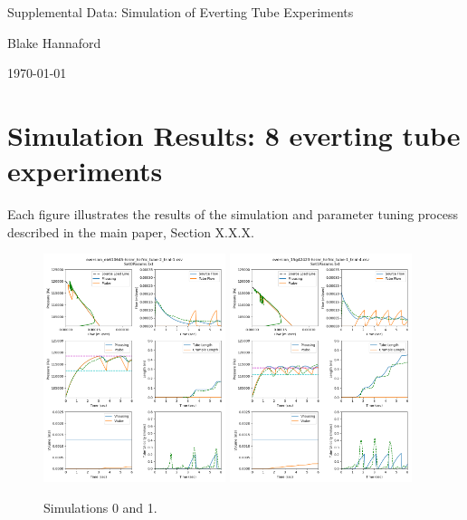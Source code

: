 \documentclass[letterpaper]{article}
\begin{document}
\begin{centering}
{\Large  Supplemental Data: Simulation of Everting Tube Experiments}

Blake Hannaford

\today

\end{centering}

\section{Simulation Results: 8 everting tube experiments}
Each figure illustrates the results of the simulation and parameter tuning process described in the main paper, Section X.X.X.
\vspace{0.5in}

\begin{figure}[h]\centering
\includegraphics[width=0.475\textwidth]{Set0result28-Jul.png}
\includegraphics[width=0.475\textwidth]{Set1result28-Jul.png}
\caption{Simulations 0 and 1.}
\end{figure}
\end{document}
